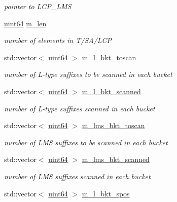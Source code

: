 \begin{DoxyCompactItemize}
\begin{DoxyCompactList}\small\item\em pointer to L\+C\+P\+\_\+\+L\+MS \end{DoxyCompactList}\item 
\hyperlink{types_8h_a60e8696a4678cd348e991a1f172e53f7}{uint64} \hyperlink{struct_validate4_1_1_r_scan_a4ba4d8371cdcc14a4a34b012ee27a7f8}{m\+\_\+len}
\begin{DoxyCompactList}\small\item\em number of elements in T/\+S\+A/\+L\+CP \end{DoxyCompactList}\item 
std\+::vector$<$ \hyperlink{types_8h_a60e8696a4678cd348e991a1f172e53f7}{uint64} $>$ \hyperlink{struct_validate4_1_1_r_scan_a47335f1e738063b9ddc5ee00be052cfd}{m\+\_\+l\+\_\+bkt\+\_\+toscan}
\begin{DoxyCompactList}\small\item\em number of L-\/type suffixes to be scanned in each bucket \end{DoxyCompactList}\item 
std\+::vector$<$ \hyperlink{types_8h_a60e8696a4678cd348e991a1f172e53f7}{uint64} $>$ \hyperlink{struct_validate4_1_1_r_scan_ace00679285e1e6082440d2485809f0cf}{m\+\_\+l\+\_\+bkt\+\_\+scanned}
\begin{DoxyCompactList}\small\item\em number of L-\/type suffixes scanned in each bucket \end{DoxyCompactList}\item 
std\+::vector$<$ \hyperlink{types_8h_a60e8696a4678cd348e991a1f172e53f7}{uint64} $>$ \hyperlink{struct_validate4_1_1_r_scan_a9681af9f2bc82ec9202da5c967f36491}{m\+\_\+lms\+\_\+bkt\+\_\+toscan}
\begin{DoxyCompactList}\small\item\em number of L\+MS suffixes to be scanned in each bucket \end{DoxyCompactList}\item 
std\+::vector$<$ \hyperlink{types_8h_a60e8696a4678cd348e991a1f172e53f7}{uint64} $>$ \hyperlink{struct_validate4_1_1_r_scan_ab56ecfb052c910af7ed356d5ad11be0b}{m\+\_\+lms\+\_\+bkt\+\_\+scanned}
\begin{DoxyCompactList}\small\item\em number of L\+MS suffixes scanned in each bucket \end{DoxyCompactList}\item 
std\+::vector$<$ \hyperlink{types_8h_a60e8696a4678cd348e991a1f172e53f7}{uint64} $>$ \hyperlink{struct_validate4_1_1_r_scan_ab9a643ec01afe4e6d3455ff025aeb612}{m\+\_\+l\+\_\+bkt\+\_\+spos}

\end{DoxyCompactItemize}
